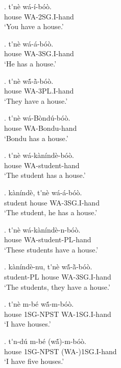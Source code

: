 \documentclass{assets/fieldnotes}
\begin{document}
\exg. t\'{}n\`{e} w\'{a}-\'{i}-b\'{o}\`{o}. \\
house WA-2SG.I-hand \\
`You have a house.'

\exg. t\'{}n\`{e} w\'{a}-\'{a}-b\'{o}\`{o}. \\
house WA-3SG.I-hand \\
`He has a house.'

\exg. t\'{}n\`{e} wã́-ã̀-b\'{o}\`{o}. \\
house WA-3PL.I-hand \\
`They have a house.'

\exg. t\'{}n\`{e} w\'{a}-B\`{o}nd\'{u}-b\'{o}\`{o}. \\
house WA-Bondu-hand \\
`Bondu has a house.'

\exg. t\'{}n\`{e} w\'{a}-k\`{a}n\'{i}nd\`{e}-b\'{o}\`{o}. \\
house WA-student-hand \\
`The student has a house.'

\exg. k\`{a}n\'{i}nd\`{e}, t\'{}n\`{e} w\'{a}-\'{a}-b\'{o}\`{o}. \\
student house WA-3SG.I-hand \\
`The student, he has a house.' 

\exg. t\'{}n\`{e} w\'{a}-k\`{a}n\'{i}nd\`{e}-n-b\'{o}\`{o}. \\
house WA-student-PL-hand \\
`These students have a house.' 

\exg. k\`{a}n\'{i}nd\`{e}-nu, t\'{}n\`{e} wã́-ã̀-b\'{o}\`{o}. \\
student-PL house WA-3SG.I-hand \\
`The students, they have a house.' 

\exg. t\'{}n\`{e} m-b\'{e} wã́-m-b\'{o}\`{o}. \\
house 1SG-NPST WA-1SG.I-hand \\
`I have houses.'

\exg. t\'{}n-d\'{u} m-b\'{e} (wã́)-m-b\'{o}\`{o}. \\
house 1SG-NPST (WA-)1SG.I-hand \\
`I have five houses.' 
\end{document}
